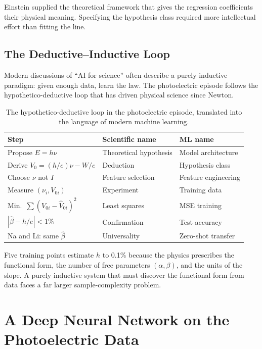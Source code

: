 \documentclass[12pt]{article}
\begin{document}
Einstein supplied the theoretical framework that gives the regression
coefficients their physical meaning.  Specifying the hypothesis class required
more intellectual effort than fitting the line.

\subsection{The Deductive--Inductive Loop}

Modern discussions of ``AI for science'' often describe a purely inductive
paradigm: given enough data, learn the law.  The photoelectric episode follows
the hypothetico-deductive loop that has driven physical science since Newton.

\begin{table}[ht]
\centering
\caption{The hypothetico-deductive loop in the photoelectric episode,
translated into the language of modern machine learning.}
\label{tab:loop}
\begin{tabular}{p{4cm}p{4cm}p{4cm}}
\toprule
Step & Scientific name & ML name \\
\midrule
Propose $E = h\nu$ & Theoretical hypothesis & Model architecture \\
Derive $V_0 = (h/e)\nu - W/e$ & Deduction &
  Hypothesis class \\
Choose $\nu$ not $I$ & Feature selection & Feature engineering \\
Measure $(\nu_i,V_{0i})$ & Experiment & Training data \\
Min.\ $\sum(V_{0i}-\hat V_{0i})^2$ & Least squares &
  MSE training \\
$|\hat\beta - h/e| < 1\%$ & Confirmation &
  Test accuracy \\
Na and Li: same $\hat\beta$ & Universality & Zero-shot transfer \\
\bottomrule
\end{tabular}
\end{table}

Five training points estimate $h$ to 0.1\% because the physics prescribes the
functional form, the number of free parameters $(\alpha,\beta)$, and the units
of the slope.  A purely inductive system that must discover the functional form
from data faces a far larger sample-complexity problem.

\section{A Deep Neural Network on the Photoelectric Data}
\label{sec:dnn}
\end{document}

